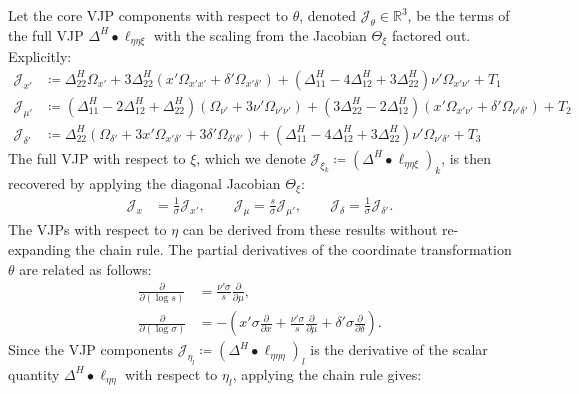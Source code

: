 \documentclass{article}
\begin{document}
Let the core VJP components with respect to $\theta$, denoted $\mathcal{J}_{\theta} \in \mathbb{R}^3$, be the terms of the full VJP $\Delta^H \bullet \ell_{\eta\eta\xi}$ with the scaling from the Jacobian $\Theta_\xi$ factored out.
Explicitly:
%
\begin{align}
  \mathcal{J}_{x'}      & \coloneqq \Delta^H_{22} \Omega_{x'} + 3 \Delta^H_{22} (x' \Omega_{x'x'} + \delta' \Omega_{x'\delta'}) + (\Delta^H_{11} - 4\Delta^H_{12} + 3\Delta^H_{22}) \nu' \Omega_{x'\nu'} + T_1            \\
  \mathcal{J}_{\mu'}    & \coloneqq (\Delta^H_{11} - 2\Delta^H_{12} + \Delta^H_{22}) (\Omega_{\nu'} + 3\nu'\Omega_{\nu'\nu'}) + (3\Delta^H_{22} - 2\Delta^H_{12}) (x'\Omega_{x'\nu'} + \delta'\Omega_{\nu'\delta'}) + T_2 \\
  \mathcal{J}_{\delta'} & \coloneqq \Delta^H_{22} (\Omega_{\delta'} + 3 x' \Omega_{x'\delta'} + 3 \delta' \Omega_{\delta'\delta'}) + (\Delta^H_{11} - 4\Delta^H_{12} + 3\Delta^H_{22}) \nu' \Omega_{\nu'\delta'} + T_3
\end{align}
%
The full VJP with respect to $\xi$, which we denote $\mathcal{J}_{\xi_k} \coloneqq (\Delta^H \bullet \ell_{\eta\eta\xi})_k$, is then recovered by applying the diagonal Jacobian $\Theta_\xi$:
%
\begin{align}
  \mathcal{J}_x & = \frac{1}{\sigma} \mathcal{J}_{x'}, \qquad \mathcal{J}_\mu = \frac{s}{\sigma} \mathcal{J}_{\mu'}, \qquad \mathcal{J}_\delta = \frac{1}{\sigma} \mathcal{J}_{\delta'}.
\end{align}
%
The VJPs with respect to $\eta$ can be derived from these results without re-expanding the chain rule.
The partial derivatives of the coordinate transformation $\theta$ are related as follows:
%
\begin{align}
  \frac{\partial}{\partial (\log s)}      & = \frac{\nu' \sigma}{s} \frac{\partial}{\partial \mu},                                                                                                            \\
  \frac{\partial}{\partial (\log \sigma)} & = - \left( x' \sigma \frac{\partial}{\partial x} + \frac{\nu' \sigma}{s} \frac{\partial}{\partial \mu} + \delta' \sigma \frac{\partial}{\partial \delta} \right).
\end{align}
%
Since the VJP components $\mathcal{J}_{\eta_l} \coloneqq (\Delta^H \bullet \ell_{\eta\eta\eta})_l$ is the derivative of the scalar quantity $\Delta^H \bullet \ell_{\eta\eta}$ with respect to $\eta_l$, applying the chain rule gives:
%
\end{document}
